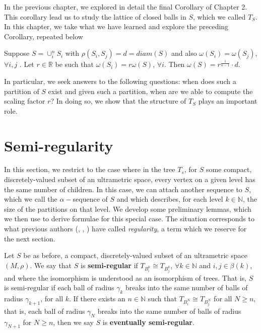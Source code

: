 In the previous chapter, we explored in detail the final Corollary of Chapter 2. This corollary lead us to study the lattice of closed balls in $S$, which we called $T_S$. In this chapter, we take what we have learned and explore the preceding Corollary, repeated below\\

\begin{corollary*}
	Suppose $S = \cup_i^n S_i$ with $\rho(S_i, S_j)=d=diam(S)$ and also $\omega(S_i)=\omega(S_j)$, $\forall i,j$ .  Let $r \in \mathbb{R}$ be such that $\omega(S_i)=r\omega(S)$, $\forall i$. Then $\omega(S) = r^{\frac{1}{n-1}}\cdot d$. 
\end{corollary*}

In particular, we seek answers to the following questions: when does such a partition of $S$ exist and given such a partition, when are we able to compute the scaling factor $r$? In doing so, we show that the structure of $T_S$ plays an important role. 


\section{Semi-regularity}
In this section, we restrict to the case where in the tree $T_s$, for $S$ some compact, discretely-valued subset of an ultrametric space, every vertex on a given level has the same number of children. In this case, we can attach another sequence to $S$, which we call the $\alpha-$sequence of $S$ and which describes, for each level $k \in \mathbb{N}$, the size of the partitions on that level. We develop some preliminary lemmas, which we then use to derive formulae for this special case. The situation corresponds to what previous authors (\cite{amice}, \cite{cef}, \cite{fp}) have called \textit{regularity}, a term which we reserve for the next section. 

\begin{definition}
Let $S$ be as before, a compact, discretely-valued subset of an ultrametric space $(M, \rho)$. We say that $S$ is \textbf{semi-regular} if $T_{B^k_i} \cong T_{B^k_j}$, $\forall k \in \mathbb{N}$ and  $i,j \in \beta(k)$, and where the isomorphism is understood as an isomorphism of trees. That is, $S$ is semi-regular if each ball of radius $\gamma_k$ breaks into the same number of balls of radius $\gamma_{k+1}$, for all $k$. If there exists an $n \in \mathbb{N}$ such that $T_{B^N_i} \cong T_{B^N_j}$ for all $N \geq n$, that is,  each ball of radius $\gamma_N$ breaks into the same number of balls of radius $\gamma_{N+1}$ for $N \geq n$, then we say $S$ is \textbf{eventually semi-regular}.
\end{definition}

